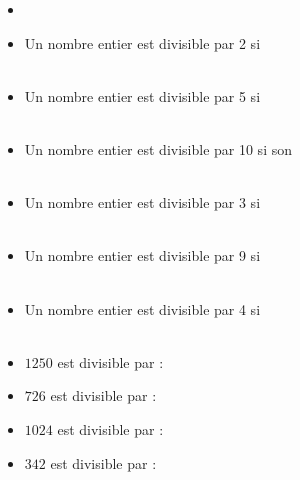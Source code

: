 \begin{myprops}
	
	\begin{itemize}
		\item \item Un nombre entier est divisible par 2 si  \\
		\ %
		\item Un nombre entier est divisible par 5 si \\
		\ 
		\item Un nombre entier est divisible par 10 si son \\
		\ 
	
		\item Un nombre entier est divisible par 3 si \\ 
		\ %
		\item Un nombre entier est divisible par 9 si \\ 
		\ %
		
		\item Un nombre entier est divisible par 4 si \\ 
		\ %
	\end{itemize}
\end{myprops}

\begin{myexs}
	\begin{itemize}
		\item $1250$ est divisible par : %
		\item $726$ est divisible par : %
		\item $1024$ est divisible par : %
		\item $342$ est divisible par : %
		
	\end{itemize}
\end{myexs}


